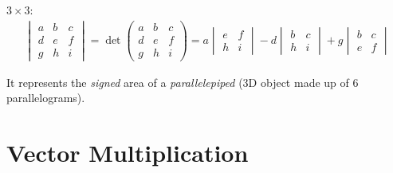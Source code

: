 \documentclass[00_complete]{subfiles}
\begin{document}
$3\times3$:
$$
\begin{gathered}
    \begin{vmatrix}
        a & b & c \\
        d & e & f \\
        g & h & i
    \end{vmatrix} = \det \begin{pmatrix}
        a & b & c \\
        d & e & f \\
        g & h & i
    \end{pmatrix} = a \begin{vmatrix}
        e & f \\ h & i
    \end{vmatrix} - d \begin{vmatrix}
        b & c \\ h & i
    \end{vmatrix} + g \begin{vmatrix}
        b & c \\ e & f
    \end{vmatrix}
\end{gathered}
$$

It represents the \emph{signed} area of a \emph{parallelepiped} (3D object made up of 6
parallelograms).

\section{Vector Multiplication}
\end{document}
